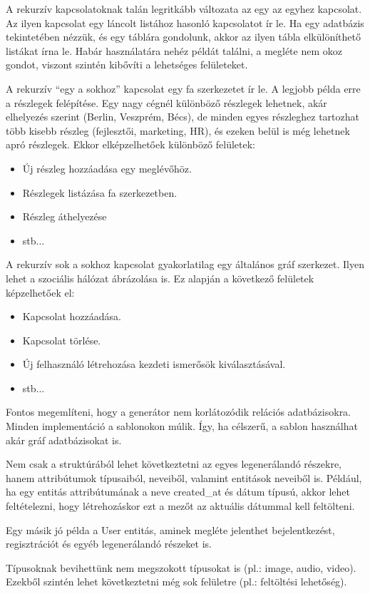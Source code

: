 \documentclass[a4paper,12pt,oneside]{report}
\begin{document}
\begin{justify}
	A rekurzív kapcsolatoknak talán legritkább változata az egy az egyhez kapcsolat. Az ilyen kapcsolat egy láncolt listához hasonló kapcsolatot ír le. Ha egy adatbázis tekintetében nézzük, és egy táblára gondolunk, akkor az ilyen tábla elkülöníthető listákat írna le. Habár használatára nehéz példát találni, a megléte nem okoz gondot, viszont szintén kibővíti a lehetséges felületeket. 

	A rekurzív ``egy a sokhoz” kapcsolat egy fa szerkezetet ír le. A legjobb példa erre a részlegek felépítése. Egy nagy cégnél különböző részlegek lehetnek, akár elhelyezés szerint (Berlin, Veszprém, Bécs), de minden egyes részleghez tartozhat több kisebb részleg (fejlesztői, marketing, HR), és ezeken belül is még lehetnek apró részlegek. Ekkor elképzelhetőek különböző felületek: 

	\begin{itemize}
		\item Új részleg hozzáadása egy meglévőhöz. 
		\item Részlegek listázása fa szerkezetben. 
		\item Részleg áthelyezése
		\item stb...
	\end{itemize}

    A rekurzív sok a sokhoz kapcsolat gyakorlatilag egy általános gráf szerkezet. Ilyen lehet a szociális hálózat ábrázolása is. Ez alapján a következő felületek képzelhetőek el: 
    \begin{itemize}
		\item Kapcsolat hozzáadása. 
		\item Kapcsolat törlése.
		\item Új felhasználó létrehozása kezdeti ismerősök kiválasztásával.
		\item stb...
	\end{itemize}

	Fontos megemlíteni, hogy a generátor nem korlátozódik relációs adatbázisokra. Minden implementáció a sablonokon múlik. Így, ha célszerű, a sablon használhat akár gráf adatbázisokat is.   

	Nem csak a struktúrából lehet következtetni az egyes legenerálandó részekre, hanem attribútumok típusaiból, neveiből, valamint entitások neveiből is. Például, ha egy entitás attribútumának a neve created\_at és dátum típusú, akkor lehet feltételezni, hogy létrehozáskor ezt a mezőt az aktuális dátummal kell feltölteni. 

	Egy másik jó példa a User entitás, aminek megléte jelenthet bejelentkezést, regisztrációt és egyéb legenerálandó részeket is.

	Típusoknak bevihettünk nem megszokott típusokat is (pl.: image, audio, video). Ezekből szintén lehet következtetni még sok felületre (pl.: feltöltési lehetőség).

\end{justify}
\end{document}
